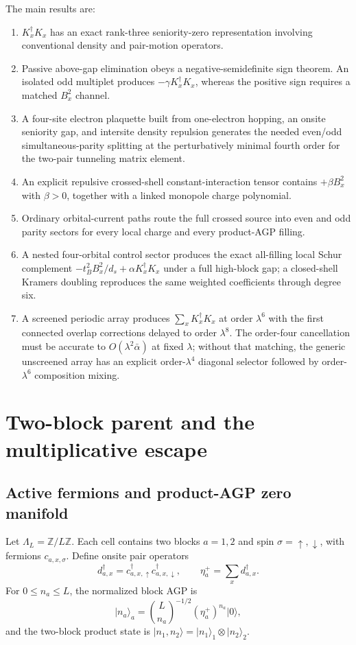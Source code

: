 \documentclass[11pt]{article}
\theoremstyle{definition}
\theoremstyle{remark}
\newcommand{\ket}[1]{\lvert #1\rangle}
\begin{document}
The main results are:
\begin{enumerate}
\item $K_x^\dagger K_x$ has an exact rank-three seniority-zero representation involving conventional density and pair-motion operators.
\item Passive above-gap elimination obeys a negative-semidefinite sign theorem.  An isolated odd multiplet produces $-\gamma K_x^\dagger K_x$, whereas the positive sign requires a matched $B_x^2$ channel.
\item A four-site electron plaquette built from one-electron hopping, an onsite seniority gap, and intersite density repulsion generates the needed even/odd simultaneous-parity splitting at the perturbatively minimal fourth order for the two-pair tunneling matrix element.
\item An explicit repulsive crossed-shell constant-interaction tensor contains $+\beta B_x^2$ with $\beta>0$, together with a linked monopole charge polynomial.
\item Ordinary orbital-current paths route the full crossed source into even and odd parity sectors for every local charge and every product-AGP filling.
\item A nested four-orbital control sector produces the exact all-filling local Schur complement $-t_B^2B_x^2/d_s+\alpha K_x^\dagger K_x$ under a full high-block gap; a closed-shell Kramers doubling reproduces the same weighted coefficients through degree six.
\item A screened periodic array produces $\sum_xK_x^\dagger K_x$ at order $\lambda^6$ with the first connected overlap corrections delayed to order $\lambda^8$.  The order-four cancellation must be accurate to $O(\lambda^2\bar\alpha)$ at fixed $\lambda$; without that matching, the generic unscreened array has an explicit order-$\lambda^4$ diagonal selector followed by order-$\lambda^6$ composition mixing.
\end{enumerate}

\section{Two-block parent and the multiplicative escape}
\label{sec:parent}

\subsection{Active fermions and product-AGP zero manifold}

Let $\Lambda_L=\mathbb Z/L\mathbb Z$.  Each cell contains two blocks $a=1,2$ and spin $\sigma=\uparrow,\downarrow$, with fermions $c_{a,x,\sigma}$.  Define onsite pair operators
\begin{equation}
 d_{a,x}^\dagger=c_{a,x,\uparrow}^\dagger c_{a,x,\downarrow}^\dagger,
 \qquad
 \eta_a^+=\sum_x d_{a,x}^\dagger.
\end{equation}
For $0\le n_a\le L$, the normalized block AGP is
\begin{equation}
 \ket{n_a}_a=\binom{L}{n_a}^{-1/2}(\eta_a^+)^{n_a}\ket0,
\end{equation}
and the two-block product state is $\ket{n_1,n_2}=\ket{n_1}_1\otimes\ket{n_2}_2$.
\end{document}
